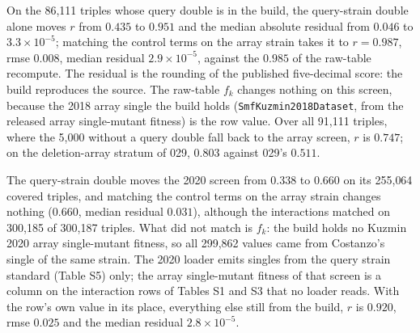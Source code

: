 On the 86{,}111 triples whose query double is in the build, the query-strain double
alone moves $r$ from $0.435$ to $0.951$ and the median absolute residual from $0.046$ to
$3.3 \times 10^{-5}$; matching the control terms on the array strain takes it to
$r = 0.987$, rmse $0.008$, median residual $2.9 \times 10^{-5}$, against the $0.985$ of
the raw-table recompute. The residual is the rounding of the published five-decimal
score: the build reproduces the source. The raw-table $f_k$ changes nothing on this
screen, because the 2018 array single the build holds (\texttt{SmfKuzmin2018Dataset},
from the released array single-mutant fitness) is the row value. Over all 91{,}111
triples, where the 5{,}000 without a query double fall back to the array screen, $r$ is
$0.747$; on the deletion-array stratum of 029, $0.803$ against 029's $0.511$.

The query-strain double moves the 2020 screen from $0.338$ to $0.660$ on its 255{,}064
covered triples, and matching the control terms on the array strain changes nothing
($0.660$, median residual $0.031$), although the interactions matched on 300{,}185 of
300{,}187 triples. What did not match is $f_k$: the build holds no Kuzmin 2020 array
single-mutant fitness, so all 299{,}862 values came from Costanzo's single of the same
strain. The 2020 loader emits singles from the query strain standard (Table S5) only;
the array single-mutant fitness of that screen is a column on the interaction rows of
Tables S1 and S3 that no loader reads. With the row's own value in its place, everything
else still from the build, $r$ is $0.920$, rmse $0.025$ and the median residual
$2.8 \times 10^{-5}$.

